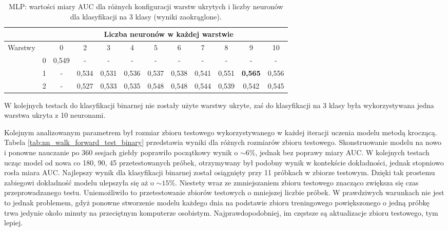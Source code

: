 \documentclass[a4paper, twoside, 11pt, openright]{article}
\begin{document}
\begin{table}[H]
    \centering
    \begin{tabular}{|c|c|c|c|c|c|c|c|c|c|c|c|}
        \hline
         & &  \multicolumn{10}{c|}{Liczba neuronów w każdej warstwie}  \\ \hline
        \multirow{4}{*}{Warstwy} & & 0 & 2 & 3 & 4 & 5 & 6 & 7 & 8 & 9 & 10  \\ \cline{2 - 12}
			& 0 & 0,549 & - & - & - & - & - & - & - & - & - \\ \cline{2 - 12} 
			& 1 & - & 0,534 &  0,531 &  0,536 &  0,537 &  0,538 &  0,541 &  0,551 &  \textbf{0,565} & 0,556 \\ \cline{2 - 12} 
			& 2 & - & 0,527 &   0,533 &   0,535 &   0,548 &   0,548 &   0,544 &   0,539 &   0,542 &   0,545  \\ \cline{2 - 12} \hline

    \end{tabular}
    \caption{MLP: wartości miary AUC dla różnych konfiguracji warstw ukrytych i liczby neuronów dla klasyfikacji na 3 klasy (wyniki zaokrąglone).}
    \label{tab:nn_layers_discrete}
\end{table}

W kolejnych testach do klasyfikacji binarnej nie zostały użyte warstwy ukryte, zaś do klasyfikacji na 3 klasy była wykorzystywana jedna warstwa ukryta z 10 neuronami.

\bigskip

Kolejnym analizowanym parametrem był rozmiar zbioru testowego wykorzystywanego w każdej iteracji uczenia modelu metodą kroczącą. Tabela \ref{tab:nn_walk_forward_test_binary} przedstawia wyniki dla różnych rozmiarów zbioru testowego. Skonstruowanie modelu na nowo i ponowne nauczanie po 360 sesjach giełdy poprawiło początkowy wynik o $\sim 6\%$, jednak bez poprawy miary AUC. W kolejnych testach ucząc model od nowa co 180, 90, 45 przetestowanych próbek, otrzymywany był podobny wynik w kontekście dokładności, jednak stopniowo rosła miara AUC. Najlepszy wynik dla klasyfikacji binarnej został osiągnięty przy 11 próbkach w zbiorze testowym. Dzięki tak prostemu zabiegowi dokładność modelu ulepszyła się aż o $\sim 15\%$. Niestety wraz ze zmniejszaniem zbioru testowego znacząco zwiększa się czas przeprowadzanego testu. Uniemożliwiło to przetestowanie zbiorów testowych o mniejszej liczbie próbek. W prawdziwych warunkach nie jest to jednak problemem, gdyż ponowne stworzenie modelu każdego dnia na podstawie zbioru treningowego powiększonego o jedną próbkę trwa jedynie około minuty na przeciętnym komputerze osobistym. Najprawdopodobniej, im częstsze są aktualizacje zbioru testowego, tym lepiej.
\end{document}
